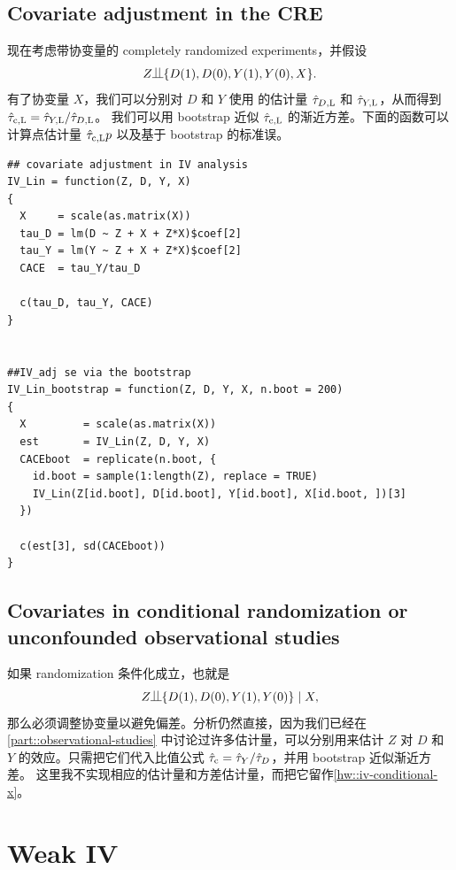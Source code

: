 \subsection{Covariate adjustment in the CRE}

现在考虑带协变量的 completely randomized experiments，并假设
$$
Z\ind \{ D(1), D(0), Y(1), Y(0), X \}.
$$
有了协变量 $X$，我们可以分别对 $D$ 和 $Y$ 使用 \citet{lin2013} 的估计量 $\hat{\tau}_{D,\textsc{L}}$ 和 $\hat{\tau}_{Y,\textsc{L}}$，从而得到 $\hat{\tau}_{\textup{c}, \textsc{L}} = \hat{\tau}_{Y,\textsc{L}} / \hat{\tau}_{D,\textsc{L}}$。
我们可以用 bootstrap 近似 $\hat{\tau}_{\textup{c}, \textsc{L}} $ 的渐近方差。下面的函数可以计算点估计量 $\hat{\tau}_{\textup{c}, \textsc{L}}p $ 以及基于 bootstrap 的标准误。
 
\begin{lstlisting}
## covariate adjustment in IV analysis
IV_Lin = function(Z, D, Y, X)
{
  X     = scale(as.matrix(X))
  tau_D = lm(D ~ Z + X + Z*X)$coef[2]
  tau_Y = lm(Y ~ Z + X + Z*X)$coef[2]
  CACE  = tau_Y/tau_D
  
  c(tau_D, tau_Y, CACE)
}


##IV_adj se via the bootstrap
IV_Lin_bootstrap = function(Z, D, Y, X, n.boot = 200)
{
  X         = scale(as.matrix(X))
  est       = IV_Lin(Z, D, Y, X)
  CACEboot  = replicate(n.boot, {
    id.boot = sample(1:length(Z), replace = TRUE)
    IV_Lin(Z[id.boot], D[id.boot], Y[id.boot], X[id.boot, ])[3]
  })
  
  c(est[3], sd(CACEboot))
}
\end{lstlisting}

\subsection{Covariates in conditional randomization or unconfounded observational studies}
\label{section::unconfounded-IV}

如果 randomization 条件化成立，也就是
$$
Z\ind \{ D(1), D(0), Y(1), Y(0) \} \mid  X,
$$
那么必须调整协变量以避免偏差。分析仍然直接，因为我们已经在\cref{part::observational-studies} 中讨论过许多估计量，可以分别用来估计 $ Z$ 对 $D$ 和 $Y$ 的效应。只需把它们代入比值公式 $\hat{\tau}_{\textup{c}} = \hat{\tau}_Y / \hat{\tau}_D$，并用 bootstrap 近似渐近方差。
这里我不实现相应的估计量和方差估计量，而把它留作\cref{hw::iv-conditional-x}。



\section{Weak IV}


